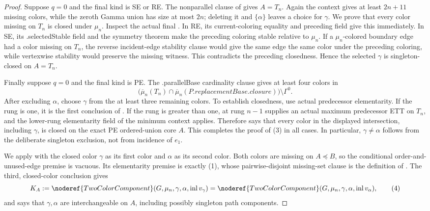 \begin{proof}
Suppose \(q=0\) and the final kind is SE or RE.  The nonparallel clause of
 gives \(A=T_n\).  Again the context gives at
least \(2n+11\) missing colors, while the zeroth Gamma union has size at
most \(2n\); deleting it and \(\{\alpha\}\) leaves a choice for
\(\gamma\).  We prove that every color missing on \(T_n\) is closed under
\(\mu_n\).  Inspect the actual final
.  In RE, its current-coloring equality and
preceding  field give this immediately.
In SE, its .selectedStable field and the
symmetry theorem  make the preceding coloring stable relative
to \(\mu_n\).  If a \(\mu_n\)-colored boundary edge had a color missing
on \(T_n\), the reverse incident-edge stability clause would give the
same edge the same color under the preceding coloring, while vertexwise
stability would preserve the missing witness.  This contradicts the
preceding closedness.  Hence the selected \(\gamma\) is singleton-closed
on \(A=T_n\).

Finally suppose \(q=0\) and the final kind is PE.  The
.parallelBase cardinality clause gives at least
four colors in
\[
 \bigl(\overline\mu_n(T_n)\cap
       \overline\mu_n(P.\mathit{replacementBase}.\mathit{closure})\bigr)
       \setminus\Gamma^0.
\]
After excluding \(\alpha\), choose \(\gamma\) from the at least three
remaining colors.  To establish closedness, use actual predecessor
elementarity.  If the rung is one, it is the first conclusion of
.  If the rung is greater than one,
 at rung \(n-1\) supplies an actual
maximum predecessor ETT on \(T_n\), and the lower-rung elementarity field
of the minimum context applies.  Therefore
 says that every color in the
displayed intersection, including \(\gamma\), is closed on the exact PE
ordered-union core \(A\).  This completes the proof of (3) in all cases.
In particular, \(\gamma\ne\alpha\) follows from the deliberate singleton
exclusion, not from incidence of \(e_1\).

We apply  with the closed color \(\gamma\) as its
first color and \(\alpha\) as its second color.  Both colors are missing
on \(A\preccurlyeq B\), so the conditional order-and-unused-edge premise
is vacuous.  Its elementarity premise is exactly (1), whose
pairwise-disjoint missing-set clause is the definition of
.  The third, closed-color conclusion
gives
\[
 K_A:=\noderef{TwoColorComponent}(G,\mu_n,\gamma,\alpha,
            \operatorname{inl}v_\gamma)
     =\noderef{TwoColorComponent}(G,\mu_n,\gamma,\alpha,
            \operatorname{inl}v_\alpha),                    \tag{4}
\]
and says that \(\gamma,\alpha\) are interchangeable on \(A\), including
possibly singleton path components.


\end{proof}
